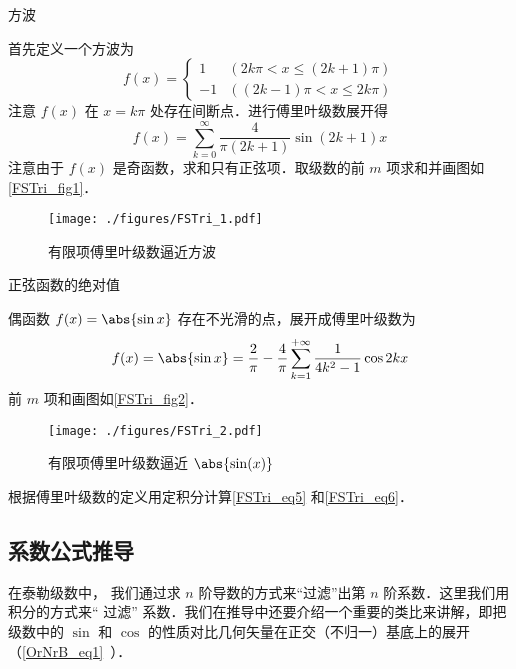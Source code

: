 \begin{example}{方波}

首先定义一个方波为
\begin{equation}\label{FSTri_eq7}
f(x) = 
\begin{cases}
1  & (2k\pi < x \leqslant (2k + 1)\pi) \\
- 1 &  ((2k - 1)\pi < x \leqslant 2k\pi)
\end{cases}
\end{equation}
注意 $f(x)$ 在 $x=k\pi$ 处存在间断点．进行傅里叶级数展开得
\begin{equation}\label{FSTri_eq5}
f(x) = \sum_{k = 0}^\infty \frac{4}{\pi (2k + 1)}\sin (2k + 1)x
\end{equation}
注意由于 $f(x)$ 是奇函数，求和只有正弦项．取级数的前 $m$ 项求和并画图如\autoref{FSTri_fig1}．

\begin{figure}[ht]
\centering
\texttt{[image: ./figures/FSTri\_1.pdf]}
\caption{有限项傅里叶级数逼近方波}\label{FSTri_fig1}
\end{figure}
\end{example}

\begin{example}{正弦函数的绝对值} %

偶函数 $f(x) = \abs{\sin x}$ 存在不光滑的点，展开成傅里叶级数为
\begin{equation}\label{FSTri_eq6}
f(x) = \abs{\sin x} = \frac{2}{\pi } - \frac{4}{\pi }\sum_{k = 1}^{+\infty} \frac{1}{4 k^2 - 1}\cos 2k x
\end{equation}
前 $m$ 项和画图如\autoref{FSTri_fig2}．
\begin{figure}[ht]
\centering
\texttt{[image: ./figures/FSTri\_2.pdf]}
\caption{有限项傅里叶级数逼近 $\abs{\sin(x)}$}\label{FSTri_fig2}
\end{figure}
\end{example}

\begin{exercise}{}
根据傅里叶级数的定义用定积分计算\autoref{FSTri_eq5} 和\autoref{FSTri_eq6}．
\end{exercise}


\subsection{系数公式推导}

在泰勒级数中，%
我们通过求 $n$ 阶导数的方式来“过滤”出第 $n$ 阶系数．这里我们用积分的方式来“ 过滤” 系数．我们在推导中还要介绍一个重要的类比来讲解，即把级数中的 $\sin$ 和 $\cos$ 的性质对比几何矢量在正交（不归一）基底上的展开（\autoref{OrNrB_eq1}~）．

